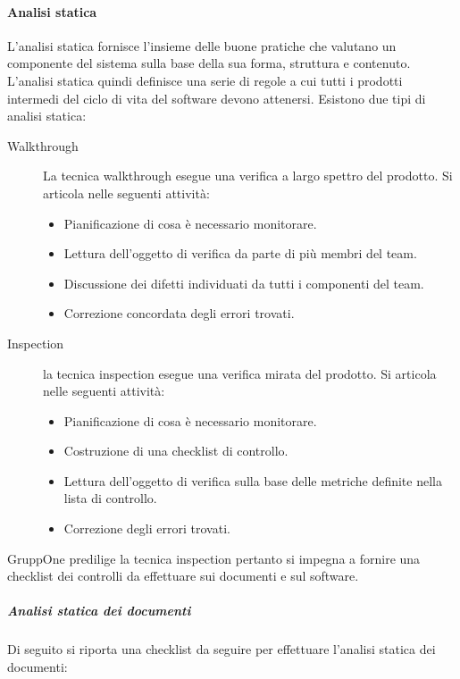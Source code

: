 \documentclass[../norme-di-progetto.tex]{subfiles}
\begin{document}
\paragraph{Analisi statica}%
\label{par:analisi_statica}
L'analisi statica fornisce l'insieme delle buone pratiche che valutano un componente del sistema sulla base della sua forma, struttura e contenuto. L'analisi statica quindi definisce una serie di regole  a cui tutti i prodotti intermedi del ciclo di vita del software devono attenersi. Esistono due tipi di analisi statica:
\begin{description}
  \item [Walkthrough] La tecnica walkthrough esegue una verifica a largo spettro del prodotto. Si articola nelle seguenti attività:
        \begin{itemize}
          \item Pianificazione di cosa è necessario monitorare.
          \item Lettura dell'oggetto di verifica da parte di più membri del team.
          \item Discussione dei difetti individuati da tutti i componenti del team.
          \item Correzione concordata degli errori trovati.
        \end{itemize}
  \item [Inspection] la tecnica inspection esegue una verifica mirata del prodotto. Si articola nelle seguenti attività:
        \begin{itemize}
          \item Pianificazione di cosa è necessario monitorare.
          \item Costruzione di una checklist di controllo.
          \item Lettura dell'oggetto di verifica sulla base delle metriche definite nella lista di controllo.
          \item Correzione degli errori trovati.
        \end{itemize}
\end{description}
GruppOne predilige la tecnica inspection pertanto si impegna a fornire una checklist dei controlli da effettuare sui documenti e sul software.

\subparagraph{Analisi statica dei documenti}%
\label{subp:analisi_statica_dei_documenti}
Di seguito si riporta una checklist da seguire per effettuare l'analisi statica dei documenti:
\end{document}
